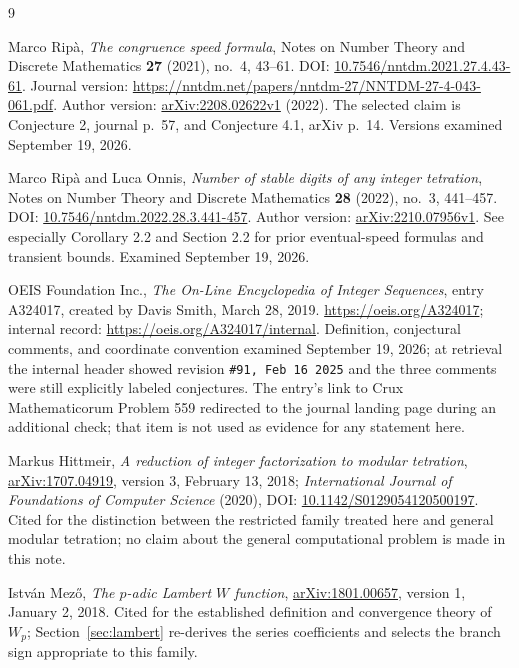 \documentclass[11pt,letterpaper]{article}
\numberwithin{equation}{section}
\theoremstyle{definition}
\theoremstyle{remark}
\begin{document}
\begingroup
\small
\setlength{\parskip}{0pt}
\begin{thebibliography}{9}
\setlength{\itemsep}{3pt}

Marco Rip\`a,
\emph{The congruence speed formula},
Notes on Number Theory and Discrete Mathematics \textbf{27} (2021), no.~4, 43--61.
DOI: \href{https://doi.org/10.7546/nntdm.2021.27.4.43-61}{10.7546/nntdm.2021.27.4.43-61}.
Journal version: \url{https://nntdm.net/papers/nntdm-27/NNTDM-27-4-043-061.pdf}.
Author version: \href{https://arxiv.org/abs/2208.02622v1}{arXiv:2208.02622v1} (2022).
The selected claim is Conjecture 2, journal p.~57, and Conjecture 4.1, arXiv p.~14. Versions examined September 19, 2026.

Marco Rip\`a and Luca Onnis,
\emph{Number of stable digits of any integer tetration},
Notes on Number Theory and Discrete Mathematics \textbf{28} (2022), no.~3, 441--457.
DOI: \href{https://doi.org/10.7546/nntdm.2022.28.3.441-457}{10.7546/nntdm.2022.28.3.441-457}.
Author version: \href{https://arxiv.org/abs/2210.07956v1}{arXiv:2210.07956v1}.
See especially Corollary 2.2 and Section 2.2 for prior eventual-speed formulas and transient bounds.
Examined September 19, 2026.

OEIS Foundation Inc.,
\emph{The On-Line Encyclopedia of Integer Sequences}, entry A324017,
created by Davis Smith, March 28, 2019.
\url{https://oeis.org/A324017}; internal record:
\url{https://oeis.org/A324017/internal}.
Definition, conjectural comments, and coordinate convention examined September 19, 2026;
at retrieval the internal header showed revision \texttt{\#91, Feb 16 2025} and the three
comments were still explicitly labeled conjectures.
The entry's link to Crux Mathematicorum Problem 559 redirected to the journal landing page
during an additional check; that item is not used as evidence for any statement here.

Markus Hittmeir,
\emph{A reduction of integer factorization to modular tetration},
\href{https://arxiv.org/abs/1707.04919}{arXiv:1707.04919}, version 3, February 13, 2018;
\emph{International Journal of Foundations of Computer Science} (2020),
DOI: \href{https://doi.org/10.1142/S0129054120500197}{10.1142/S0129054120500197}.
Cited for the distinction between the restricted family treated here and general modular
tetration; no claim about the general computational problem is made in this note.

Istv\'an Mez\H{o},
\emph{The $p$-adic Lambert $W$ function},
\href{https://arxiv.org/abs/1801.00657}{arXiv:1801.00657}, version 1, January 2, 2018.
Cited for the established definition and convergence theory of $W_p$; Section~\ref{sec:lambert}
re-derives the series coefficients and selects the branch sign appropriate to this family.


\end{thebibliography}
\end{document}
